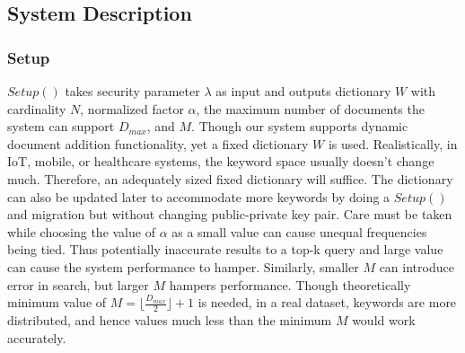 \documentclass[sigconf,pdftex]{acmart}
\begin{document}
 






\subsection{System Description}

\subsubsection{\textbf{Setup}}

$Setup()$ takes security parameter $\lambda$ as input and outputs dictionary $W$ with cardinality $N$, normalized factor $\alpha$, the maximum number of documents the system can support $D_{max}$, and $M$. Though our system supports dynamic document addition functionality, yet a fixed dictionary $W$ is used. Realistically, in IoT, mobile, or healthcare systems, the keyword space usually doesn't change much. Therefore, an adequately sized fixed dictionary will suffice. The dictionary can also be updated later to accommodate more keywords by doing a $Setup()$ and migration but without changing public-private key pair. Care must be taken while choosing the value of $\alpha$ as a small value can cause unequal frequencies being tied. Thus potentially inaccurate results to a top-k query and large value can cause the system performance to hamper. Similarly, smaller $M$ can introduce error in search, but larger $M$ hampers performance. Though theoretically minimum value of $M =\lfloor\frac{D_{max}}{2}\rfloor+1$ is needed, in a real dataset, keywords are more distributed, and hence values much less than the minimum $M$ would work accurately.
\end{document}
